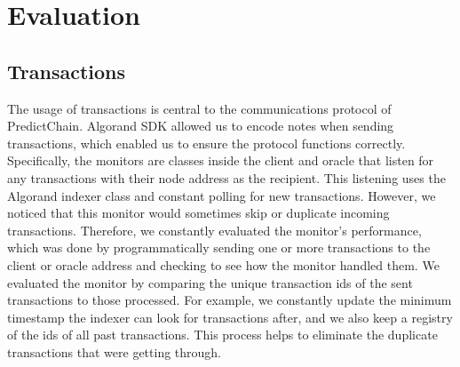 \documentclass{ledger}
\begin{document}



\section{Evaluation}


\subsection{Transactions}

The usage of transactions is central to the communications protocol of PredictChain.  Algorand SDK allowed us to encode notes when sending transactions, which enabled us to ensure the protocol functions correctly.
Specifically, the monitors are classes inside the client and oracle that listen for any transactions with their node address as the recipient. This listening uses the Algorand indexer class and constant polling for new transactions. However, we noticed that this monitor would sometimes skip or duplicate incoming transactions. Therefore, we constantly evaluated the monitor's performance, which was done by programmatically sending one or more transactions to the client or oracle address and checking to see how the monitor handled them. We evaluated the monitor by comparing the unique transaction ids of the sent transactions to those processed. For example, we constantly update the minimum timestamp the indexer can look for transactions after, and we also keep a registry of the ids of all past transactions. This process helps to eliminate the duplicate transactions that were getting through.
\end{document}
